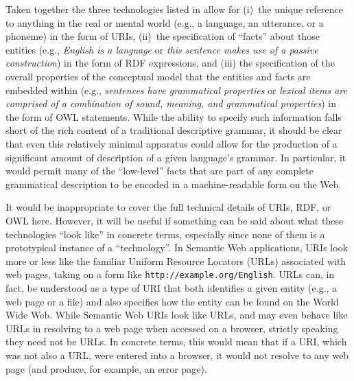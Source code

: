 Taken together the three technologies listed in  allow for (i)~the
unique reference to anything in the real or mental world (e.g., a language, an
utterance, or a phoneme) in the form of URIs, (ii)~the specification of
``facts'' about those entities (e.g., \emph{English is a language} or \emph{this
sentence makes use of a passive construction}) in the form of RDF expressions,
and (iii) the specification of the overall properties of the conceptual model
that the entities and facts are embedded within (e.g., \emph{sentences have
grammatical properties} or \emph{lexical items are comprised of a combination of
sound, meaning, and grammatical properties}) in the form of OWL statements.
While the ability to specify such information falls short of the rich content of
a traditional descriptive grammar, it should be clear
that even this relatively minimal apparatus could allow for the production of a
significant amount of description of a given language's grammar. In particular,
it would permit many of the ``low-level'' facts that are part of any complete
grammatical description to be encoded in a machine-readable form on the Web.

It would be inappropriate to cover the full technical details of URIs, RDF, or
OWL here. However, it will be useful if something can be said about what these
technologies ``look like'' in concrete terms, especially since none of them is a
prototypical instance of a ``technology''. In Semantic Web applications, URIs
look more or less like the familiar Uniform Resource Locators (URLs) associated
with web pages, taking on a form like \texttt{http://example.org/English}. URLs can, in
fact, be understood as a type of URI that both identifies a given entity (e.g.,
a web page or a file) and also specifies how the entity can be found on the
World Wide Web. While Semantic Web URIs look like URLs, and may even behave like
URLs in resolving to a web page when accessed on a browser, strictly speaking
they need not be URLs. In concrete terms, this would mean that if a URI, which
was not also a URL, were entered into a browser, it would not resolve to any web
page (and produce, for example, an error page).

